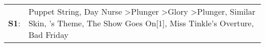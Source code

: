 \begin{supertabular}{p{0.03\textwidth}p{0.92\textwidth}}
 \textbf{S1}:  &  Puppet String\textsuperscript{}, \enspace Day Nurse\textsuperscript{} \textgreater \enspace Plunger\textsuperscript{} \textgreater \enspace Glory\textsuperscript{} \textgreater \enspace Plunger\textsuperscript{}, \enspace Similar Skin\textsuperscript{}, 's Theme\textsuperscript{}, \enspace The Show Goes On[1]\textsuperscript{}, \enspace Miss Tinkle's Overture\textsuperscript{}, \enspace Bad Friday\textsuperscript{}  \enspace  \\
\end{supertabular}
